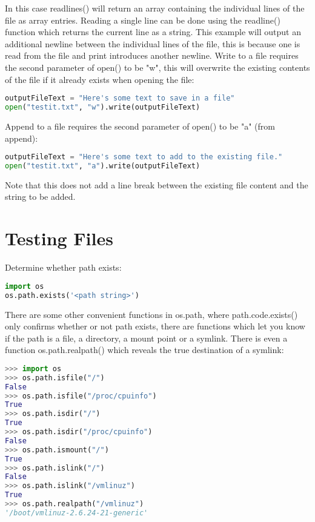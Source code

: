 In this case readlines() will return an array containing the individual lines of
the file as array entries. Reading a single line can be done using the
readline() function which returns the current line as a string. This example
will output an additional newline between the individual lines of the file, this
is because one is read from the file and print introduces another newline.
Write to a file requires the second parameter of open() to be "w", this will
overwrite the existing contents of the file if it already exists when opening
the file:
\lstset{basicstyle=\scriptsize, numbers=left, captionpos=b, tabsize=4}
\begin{lstlisting}[caption=Write to file,language={Python},
xleftmargin=15pt, label=lst:writetofile]
outputFileText = "Here's some text to save in a file"
open("testit.txt", "w").write(outputFileText)
\end{lstlisting}

Append to a file requires the second parameter of open() to be "a" (from append):
\lstset{basicstyle=\scriptsize, numbers=left, captionpos=b, tabsize=4}
\begin{lstlisting}[caption=Append to file,language={Python},
xleftmargin=15pt, label=lst:appendtofile]
outputFileText = "Here's some text to add to the existing file."
open("testit.txt", "a").write(outputFileText)
\end{lstlisting}

Note that this does not add a line break between the existing file content and
the string to be added.

\section{Testing Files}
Determine whether path exists:
\lstset{basicstyle=\scriptsize, numbers=left, captionpos=b, tabsize=4}
\begin{lstlisting}[caption=Test if file exists,language={Python},
xleftmargin=15pt, label=lst:testiffileexists]
import os
os.path.exists('<path string>')
\end{lstlisting}

There are some other convenient functions in os.path, where path.code.exists()
only confirms whether or not path exists, there are functions which let you know
if the path is a file, a directory, a mount point or a symlink. There is even a
function os.path.realpath() which reveals the true destination of a symlink:
\lstset{basicstyle=\scriptsize, numbers=left, captionpos=b, tabsize=4}
\begin{lstlisting}[caption=Test Path,language={Python},
xleftmargin=15pt, label=lst:testpath]
>>> import os
>>> os.path.isfile("/")
False
>>> os.path.isfile("/proc/cpuinfo")
True
>>> os.path.isdir("/")
True
>>> os.path.isdir("/proc/cpuinfo")
False
>>> os.path.ismount("/")
True
>>> os.path.islink("/")
False
>>> os.path.islink("/vmlinuz")
True
>>> os.path.realpath("/vmlinuz")
'/boot/vmlinuz-2.6.24-21-generic'
\end{lstlisting}

